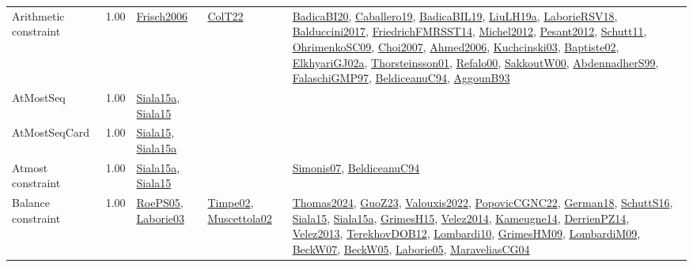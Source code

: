 {\begin{longtable}{p{3cm}r>{\raggedright\arraybackslash}p{6cm}>{\raggedright\arraybackslash}p{6cm}>{\raggedright\arraybackslash}p{8cm}}
\index{Arithmetic constraint}\index{Constraints!Arithmetic constraint}Arithmetic constraint &  1.00 & \hyperref[detail:Frisch2006]{Frisch2006} & \hyperref[detail:ColT22]{ColT22} & \hyperref[detail:BadicaBI20]{BadicaBI20}, \hyperref[detail:Caballero19]{Caballero19}, \hyperref[detail:BadicaBIL19]{BadicaBIL19}, \hyperref[detail:LiuLH19a]{LiuLH19a}, \hyperref[detail:LaborieRSV18]{LaborieRSV18}, \hyperref[detail:Balduccini2017]{Balduccini2017}, \hyperref[detail:FriedrichFMRSST14]{FriedrichFMRSST14}, \hyperref[detail:Michel2012]{Michel2012}, \hyperref[detail:Pesant2012]{Pesant2012}, \hyperref[detail:Schutt11]{Schutt11}, \hyperref[detail:OhrimenkoSC09]{OhrimenkoSC09}, \hyperref[detail:Choi2007]{Choi2007}, \hyperref[detail:Ahmed2006]{Ahmed2006}, \hyperref[detail:Kuchcinski03]{Kuchcinski03}, \hyperref[detail:Baptiste02]{Baptiste02}, \hyperref[detail:ElkhyariGJ02a]{ElkhyariGJ02a}, \hyperref[detail:Thorsteinsson01]{Thorsteinsson01}, \hyperref[detail:Refalo00]{Refalo00}, \hyperref[detail:SakkoutW00]{SakkoutW00}, \hyperref[detail:AbdennadherS99]{AbdennadherS99}, \hyperref[detail:FalaschiGMP97]{FalaschiGMP97}, \hyperref[detail:BeldiceanuC94]{BeldiceanuC94}, \hyperref[detail:AggounB93]{AggounB93}\\
\index{AtMostSeq}\index{Constraints!AtMostSeq}AtMostSeq &  1.00 & \hyperref[detail:Siala15a]{Siala15a}, \hyperref[detail:Siala15]{Siala15} &  & \\
\index{AtMostSeqCard}\index{Constraints!AtMostSeqCard}AtMostSeqCard &  1.00 & \hyperref[detail:Siala15]{Siala15}, \hyperref[detail:Siala15a]{Siala15a} &  & \\
\index{Atmost constraint}\index{Constraints!Atmost constraint}Atmost constraint &  1.00 & \hyperref[detail:Siala15a]{Siala15a}, \hyperref[detail:Siala15]{Siala15} &  & \hyperref[detail:Simonis07]{Simonis07}, \hyperref[detail:BeldiceanuC94]{BeldiceanuC94}\\
\index{Balance constraint}\index{Constraints!Balance constraint}Balance constraint &  1.00 & \hyperref[detail:RoePS05]{RoePS05}, \hyperref[detail:Laborie03]{Laborie03} & \hyperref[detail:Timpe02]{Timpe02}, \hyperref[detail:Muscettola02]{Muscettola02} & \hyperref[detail:Thomas2024]{Thomas2024}, \hyperref[detail:GuoZ23]{GuoZ23}, \hyperref[detail:Valouxis2022]{Valouxis2022}, \hyperref[detail:PopovicCGNC22]{PopovicCGNC22}, \hyperref[detail:German18]{German18}, \hyperref[detail:SchuttS16]{SchuttS16}, \hyperref[detail:Siala15]{Siala15}, \hyperref[detail:Siala15a]{Siala15a}, \hyperref[detail:GrimesH15]{GrimesH15}, \hyperref[detail:Velez2014]{Velez2014}, \hyperref[detail:Kameugne14]{Kameugne14}, \hyperref[detail:DerrienPZ14]{DerrienPZ14}, \hyperref[detail:Velez2013]{Velez2013}, \hyperref[detail:TerekhovDOB12]{TerekhovDOB12}, \hyperref[detail:Lombardi10]{Lombardi10}, \hyperref[detail:GrimesHM09]{GrimesHM09}, \hyperref[detail:LombardiM09]{LombardiM09}, \hyperref[detail:BeckW07]{BeckW07}, \hyperref[detail:BeckW05]{BeckW05}, \hyperref[detail:Laborie05]{Laborie05}, \hyperref[detail:MaraveliasCG04]{MaraveliasCG04}\\

\end{longtable}}

